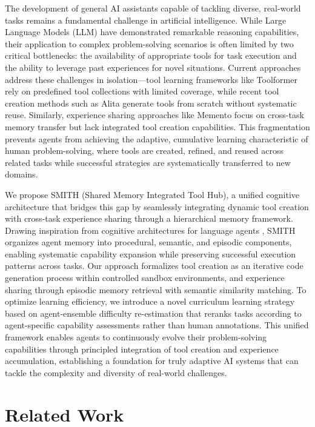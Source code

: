 \documentclass{article} %
\begin{document}
The development of general AI assistants capable of tackling diverse, real-world tasks remains a fundamental challenge in artificial intelligence. While Large Language Models (LLM) have demonstrated remarkable reasoning capabilities, their application to complex problem-solving scenarios is often limited by two critical bottlenecks: the availability of appropriate tools for task execution and the ability to leverage past experiences for novel situations. Current approaches address these challenges in isolation—tool learning frameworks like Toolformer \citep{schick2023toolformer} rely on predefined tool collections with limited coverage, while recent tool creation methods such as Alita \citep{qiu2025alita} generate tools from scratch without systematic reuse. Similarly, experience sharing approaches like Memento \citep{zhou2025memento} focus on cross-task memory transfer but lack integrated tool creation capabilities. This fragmentation prevents agents from achieving the adaptive, cumulative learning characteristic of human problem-solving, where tools are created, refined, and reused across related tasks while successful strategies are systematically transferred to new domains.

We propose SMITH (Shared Memory Integrated Tool Hub), a unified cognitive architecture that bridges this gap by seamlessly integrating dynamic tool creation with cross-task experience sharing through a hierarchical memory framework. Drawing inspiration from cognitive architectures for language agents \citep{sumers2023cognitive}, SMITH organizes agent memory into procedural, semantic, and episodic components, enabling systematic capability expansion while preserving successful execution patterns across tasks. Our approach formalizes tool creation as an iterative code generation process within controlled sandbox environments, and experience sharing through episodic memory retrieval with semantic similarity matching. To optimize learning efficiency, we introduce a novel curriculum learning strategy based on agent-ensemble difficulty re-estimation that reranks tasks according to agent-specific capability assessments rather than human annotations. This unified framework enables agents to continuously evolve their problem-solving capabilities through principled integration of tool creation and experience accumulation, establishing a foundation for truly adaptive AI systems that can tackle the complexity and diversity of real-world challenges.

\section{Related Work}
\label{related_work}
\end{document}
